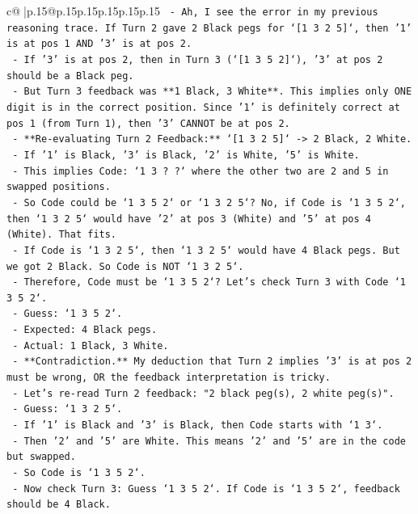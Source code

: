 \documentclass{article}
\begin{document}
{\begin{supertabular}{c@{$\;$}|p{.15\linewidth}@{}p{.15\linewidth}p{.15\linewidth}p{.15\linewidth}p{.15\linewidth}p{.15\linewidth}}
{{{\texttt{  {-} Ah, I see the error in my previous reasoning trace. If Turn 2 gave 2 Black pegs for `{[}1 3 2 5{]}`, then '1' is at pos 1 AND '3' is at pos 2.} \\
\texttt{  {-} If '3' is at pos 2, then in Turn 3 (`{[}1 3 5 2{]}`), '3' at pos 2 should be a Black peg.} \\
\texttt{  {-} But Turn 3 feedback was **1 Black, 3 White**. This implies only ONE digit is in the correct position. Since '1' is definitely correct at pos 1 (from Turn 1), then '3' CANNOT be at pos 2.} \\
\texttt{  {-} **Re{-}evaluating Turn 2 Feedback:** `{[}1 3 2 5{]}` {-}> 2 Black, 2 White.} \\
\texttt{    {-} If '1' is Black, '3' is Black, '2' is White, '5' is White.} \\
\texttt{    {-} This implies Code: `1 3 ? ?` where the other two are 2 and 5 in swapped positions.} \\
\texttt{    {-} So Code could be `1 3 5 2` or `1 3 2 5`? No, if Code is `1 3 5 2`, then `1 3 2 5` would have '2' at pos 3 (White) and '5' at pos 4 (White). That fits.} \\
\texttt{    {-} If Code is `1 3 2 5`, then `1 3 2 5` would have 4 Black pegs. But we got 2 Black. So Code is NOT `1 3 2 5`.} \\
\texttt{    {-} Therefore, Code must be `1 3 5 2`? Let's check Turn 3 with Code `1 3 5 2`.} \\
\texttt{      {-} Guess: `1 3 5 2`.} \\
\texttt{      {-} Expected: 4 Black pegs.} \\
\texttt{      {-} Actual: 1 Black, 3 White.} \\
\texttt{      {-} **Contradiction.** My deduction that Turn 2 implies '3' is at pos 2 must be wrong, OR the feedback interpretation is tricky.} \\
\texttt{      {-} Let's re{-}read Turn 2 feedback: "2 black peg(s), 2 white peg(s)".} \\
\texttt{      {-} Guess: `1 3 2 5`.} \\
\texttt{      {-} If '1' is Black and '3' is Black, then Code starts with `1 3`.} \\
\texttt{      {-} Then '2' and '5' are White. This means '2' and '5' are in the code but swapped.} \\
\texttt{      {-} So Code is `1 3 5 2`.} \\
\texttt{      {-} Now check Turn 3: Guess `1 3 5 2`. If Code is `1 3 5 2`, feedback should be 4 Black.} \\
}}}
\end{supertabular}}
\end{document}
